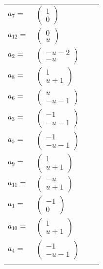 \documentclass[1p]{elsarticle_modified}
\theoremstyle{definition}
\begin{document}
\begin{tabular}{m{7pt} m{180pt} m{7pt} m{180pt} }
\flushright $a_{7}=$&$\begin{pmatrix}1\\0\end{pmatrix}$ \\
\flushright $a_{12}=$&$\begin{pmatrix}0\\u\end{pmatrix}$ \\
\flushright $a_{2}=$&$\begin{pmatrix}- u-2\\- u\end{pmatrix}$ \\
\flushright $a_{8}=$&$\begin{pmatrix}1\\u+1\end{pmatrix}$ \\
\flushright $a_{6}=$&$\begin{pmatrix}u\\- u-1\end{pmatrix}$ \\
\flushright $a_{3}=$&$\begin{pmatrix}-1\\- u-1\end{pmatrix}$ \\
\flushright $a_{5}=$&$\begin{pmatrix}-1\\- u-1\end{pmatrix}$ \\
\flushright $a_{9}=$&$\begin{pmatrix}1\\u+1\end{pmatrix}$ \\
\flushright $a_{11}=$&$\begin{pmatrix}- u\\u+1\end{pmatrix}$ \\
\flushright $a_{1}=$&$\begin{pmatrix}-1\\0\end{pmatrix}$ \\
\flushright $a_{10}=$&$\begin{pmatrix}1\\u+1\end{pmatrix}$ \\
\flushright $a_{4}=$&$\begin{pmatrix}-1\\- u-1\end{pmatrix}$\\&\end{tabular}
\end{document}
